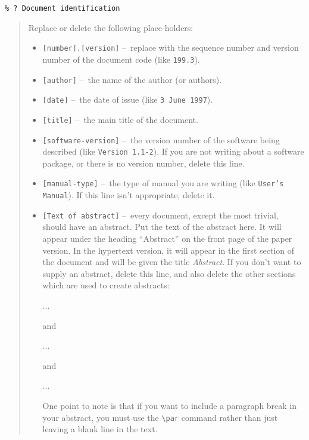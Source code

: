 \documentclass[twoside,11pt,nolof]{starlink}
\providecommand{\dash}{--}
\begin{document}
\vspace{6mm}

\verb+% ? Document identification+

\begin{quote}
Replace or delete the following place-holders:
\begin{itemize}
\item \texttt{[number].[version]} \dash\ replace with the sequence number and
 version number of the document code (like \texttt{199.3}).
\item \texttt{[author]} \dash\ the name of the author (or authors).
\item \texttt{[date]} \dash\ the date of issue (like \texttt{3 June 1997}).
\item \texttt{[title]} \dash\ the main title of the document.
\item \texttt{[software-version]} \dash\ the version number of the software
being described (like \texttt{Version 1.1-2}).
 If you are not writing about a software package, or there is no version
 number, delete this line.
\item \texttt{[manual-type]} \dash\ the type of manual you are writing
 (like \texttt{User's Manual}).
 If this line isn't appropriate, delete it.
\item \texttt{[Text of abstract]} \dash\ every document, except the most
 trivial, should have an abstract.
 Put the text of the abstract here.
 It will appear under the heading ``Abstract'' on the front page of the paper
 version.
 In the hypertext version, it will appear in the first section of the document
 and will be given the title \emph{Abstract}.
 If you don't want to supply an abstract, delete this line, and also delete
 the other sections which are used to create abstracts:
\begin{terminalv}
...
\end{terminalv}
 and
\begin{terminalv}
...
\end{terminalv}
 and
\begin{terminalv}
...
\end{terminalv}
One point to note is that if you want to include a paragraph break in your
abstract, you must use the \verb+\par+ command rather than just leaving a
blank line in the text.
\end{itemize}
\end{quote}
\end{document}
